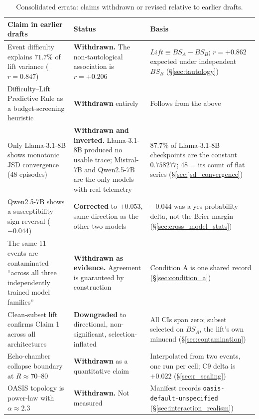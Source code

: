 \documentclass[11pt,journal,onecolumn]{IEEEtran}
\begin{document}
\begin{table}[!htbp]
\centering
\caption{Consolidated errata: claims withdrawn or revised relative to earlier drafts.}
\label{tab:errata}
\small
\begin{tabular}{>{\raggedright\arraybackslash}p{4.4cm}>{\raggedright\arraybackslash}p{5.6cm}>{\raggedright\arraybackslash}p{5.6cm}}
\toprule
\textbf{Claim in earlier drafts} & \textbf{Status} & \textbf{Basis} \\
\midrule
Event difficulty explains $71.7\%$ of lift variance ($r = 0.847$) &
\textbf{Withdrawn.} The non-tautological association is $r = +0.206$ &
$Lift \equiv BS_A - BS_B$; $r = +0.862$ expected under independent $BS_B$ (\S\ref{sec:tautology}) \\
\addlinespace
Difficulty--Lift Predictive Rule as a budget-screening heuristic &
\textbf{Withdrawn} entirely &
Follows from the above \\
\addlinespace
Only Llama-3.1-8B shows monotonic JSD convergence (48 episodes) &
\textbf{Withdrawn and inverted.} Llama-3.1-8B produced no usable trace; Mistral-7B and Qwen2.5-7B are the only models with real telemetry &
$87.7\%$ of Llama-3.1-8B checkpoints are the constant $0.758277$; 48 = its count of flat series (\S\ref{sec:jsd_convergence}) \\
\addlinespace
Qwen2.5-7B shows a susceptibility sign reversal ($-0.044$) &
\textbf{Corrected} to $+0.053$, same direction as the other two models &
$-0.044$ was a yes-probability delta, not the Brier margin (\S\ref{sec:cross_model_stats}) \\
\addlinespace
The same 11 events are contaminated ``across all three independently trained model families'' &
\textbf{Withdrawn as evidence.} Agreement is guaranteed by construction &
Condition A is one shared record (\S\ref{sec:condition_a}) \\
\addlinespace
Clean-subset lift confirms Claim 1 across all architectures &
\textbf{Downgraded} to directional, non-significant, selection-inflated &
All CIs span zero; subset selected on $BS_A$, the lift's own minuend (\S\ref{sec:contamination}) \\
\addlinespace
Echo-chamber collapse boundary at $R \approx 70$--$80$ &
\textbf{Withdrawn} as a quantitative claim &
Interpolated from two events, one run per cell; C9 delta is $+0.022$ (\S\ref{sec:r_scaling}) \\
\addlinespace
OASIS topology is power-law with $\alpha \approx 2.3$ &
\textbf{Withdrawn.} Not measured &
Manifest records \texttt{oasis-default-unspecified} (\S\ref{sec:interaction_realism}) \\

\end{tabular}
\end{table}
\end{document}
